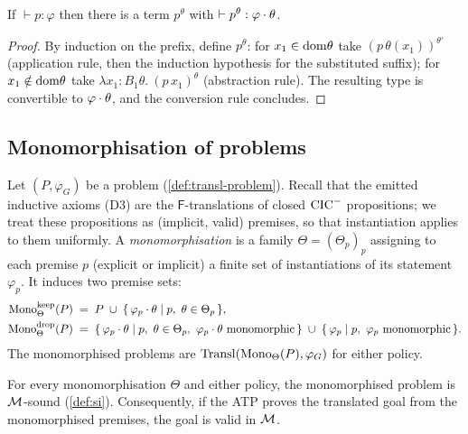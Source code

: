 \begin{proposition}
\label{prop:inst-derivable}
If $\vdash p : \varphi$ then there is a term $p^{\theta}$ with
$\vdash p^{\theta} : \varphi \cdot \theta$.
\end{proposition}

\begin{proof}
By induction on the prefix, define $p^{\theta}$: for $x_1 \in
\mathrm{dom}\theta$ take $(p\,\theta(x_1))^{\theta'}$ (application rule,
then the induction hypothesis for the substituted suffix); for $x_1
\notin \mathrm{dom}\theta$ take $\lambda x_1{:}B_1\theta.\ (p\,x_1)^{\theta}$
(abstraction rule).  The resulting type is convertible to
$\varphi \cdot \theta$, and the conversion rule concludes.
\end{proof}

\subsection{Monomorphisation of problems}

\begin{definition}[Monomorphisation]
\label{def:mono-op}
Let $(P, \varphi_G)$ be a problem (\cref{def:transl-problem}).
Recall that the emitted inductive axioms (D3) are the
$\mathsf{F}$-translations of closed $\mathrm{CIC}^{-}$ propositions; we treat
these propositions as (implicit, valid) premises, so that
instantiation applies to them uniformly.  A \emph{monomorphisation}
is a family $\Theta = (\Theta_p)_{p}$ assigning to each premise $p$
(explicit or implicit) a finite set of instantiations of its
statement $\varphi_p$.  It induces two premise sets:
\begin{align*}
  \mathrm{Mono}^{\mathrm{keep}}_{\Theta}(P) &\;=\;
    P \;\cup\; \{\,\varphi_p \cdot \theta \mid p, \ \theta \in \Theta_p\,\},\\
  \mathrm{Mono}^{\mathrm{drop}}_{\Theta}(P) &\;=\;
    \{\,\varphi_p \cdot \theta \mid p, \ \theta \in \Theta_p,\
      \varphi_p \cdot \theta \text{ monomorphic}\,\}
    \;\cup\; \{\,\varphi_p \mid p, \ \varphi_p \text{ monomorphic}\,\}.
\end{align*}
The monomorphised problems are $\mathrm{Transl}(\mathrm{Mono}_\Theta(P),
\varphi_G)$ for either policy.
\end{definition}

\begin{theorem}
\label{thm:mono-sound}
For every monomorphisation $\Theta$ and either policy, the
monomorphised problem is $\mathcal{M}$-sound (\cref{def:si}).  Consequently,
if the ATP proves the translated goal from the monomorphised
premises, the goal is valid in $\mathcal{M}$.
\end{theorem}

